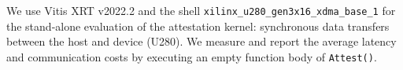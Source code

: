 

We use Vitis XRT v2022.2 and the shell \texttt{xilinx\_u280\_gen3x16\_xdma\_base\_1} for the stand-alone evaluation of the \projecttitle{} attestation kernel: synchronous data transfers between the host and device (U280). We measure and report the average latency and communication costs by executing an empty function body of \texttt{Attest()}.




